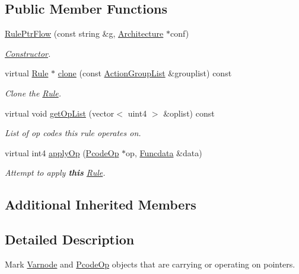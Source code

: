 \subsection*{Public Member Functions}
\begin{DoxyCompactItemize}
\item 
\mbox{\hyperlink{class_rule_ptr_flow_a30a05dd13b867b4d8e99358a13969626}{Rule\+Ptr\+Flow}} (const string \&g, \mbox{\hyperlink{class_architecture}{Architecture}} $\ast$conf)
\begin{DoxyCompactList}\small\item\em \mbox{\hyperlink{class_constructor}{Constructor}}. \end{DoxyCompactList}\item 
virtual \mbox{\hyperlink{class_rule}{Rule}} $\ast$ \mbox{\hyperlink{class_rule_ptr_flow_a8a960fd15c7bf9c4eefbc185523fd3fc}{clone}} (const \mbox{\hyperlink{class_action_group_list}{Action\+Group\+List}} \&grouplist) const
\begin{DoxyCompactList}\small\item\em Clone the \mbox{\hyperlink{class_rule}{Rule}}. \end{DoxyCompactList}\item 
virtual void \mbox{\hyperlink{class_rule_ptr_flow_a2e6086b3c89a5e65b711daea5442f90c}{get\+Op\+List}} (vector$<$ uint4 $>$ \&oplist) const
\begin{DoxyCompactList}\small\item\em List of op codes this rule operates on. \end{DoxyCompactList}\item 
virtual int4 \mbox{\hyperlink{class_rule_ptr_flow_a4f230dae0158096df0c68cd373abaaf6}{apply\+Op}} (\mbox{\hyperlink{class_pcode_op}{Pcode\+Op}} $\ast$op, \mbox{\hyperlink{class_funcdata}{Funcdata}} \&data)
\begin{DoxyCompactList}\small\item\em Attempt to apply {\bfseries{this}} \mbox{\hyperlink{class_rule}{Rule}}. \end{DoxyCompactList}\end{DoxyCompactItemize}
\subsection*{Additional Inherited Members}


\subsection{Detailed Description}
Mark \mbox{\hyperlink{class_varnode}{Varnode}} and \mbox{\hyperlink{class_pcode_op}{Pcode\+Op}} objects that are carrying or operating on pointers. 

